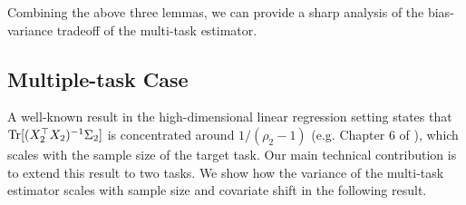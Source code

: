 


Combining the above three lemmas, we can provide a sharp analysis of the bias-variance tradeoff of the multi-task estimator.


\subsection{Multiple-task Case}\label{sec_multiple}

A well-known result in the high-dimensional linear regression setting states that $\operatorname{Tr}[(X_2^{\top}X_2)^{-1}\Sigma_2]$ is concentrated around $1 / (\rho_2 - 1)$ (e.g. Chapter 6 of \cite{S07}), which scales with the sample size of the target task.
Our main technical contribution is to extend this result to two tasks.
We show how the variance of the multi-task estimator scales with sample size and covariate shift in the following result.







